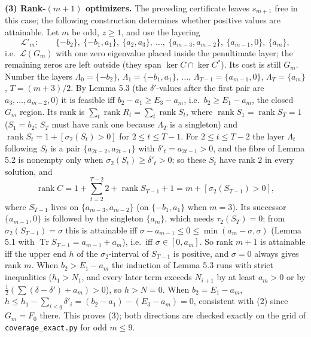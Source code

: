 \documentclass[
  11pt,
  a4paper,
]{article}
\newcounter{none} %
\begin{document}
\textbf{(3) Rank-\((m+1)\) optimizers.} The preceding certificate leaves
\(s_{m+1}\) free in this case; the following construction determines
whether positive values are attainable. Let \(m\) be odd, \(z\ge1\), and
use the layering
\[\mathcal L'_m:\qquad \{-b_2\},\ \{-b_1,a_1\},\ \{a_2,a_3\},\ \dots,\ \{a_{m-3},a_{m-2}\},\ \{a_{m-1},0\},\ \{a_m\},\]
i.e.~\(\mathcal L(G_m)\) with one zero eigenvalue placed inside the
penultimate layer; the remaining zeros are left outside (they span
\(\ker C\cap\ker C^*\)). Its cost is still \(G_m\). Number the layers
\(\Lambda_0=\{-b_2\}\), \(\Lambda_1=\{-b_1,\allowbreak{}a_1\}\), \(\dots\),
\(\Lambda_{T-1}=\{a_{m-1},\allowbreak{}0\}\), \(\Lambda_T=\{a_m\}\), \(T=(m+3)/2\).
By Lemma 5.3 (the \(\delta'\)-values after the first pair are
\(a_3,\allowbreak{}\dots,\allowbreak{}a_{m-2},\allowbreak{}0\)) it is feasible iff \(b_2-a_1\ge E_3-a_m\),
i.e.~\(b_2\ge E_1-a_m\), the closed \(G_m\) region. Its rank is
\(\sum_t\operatorname{rank}R_t=\sum_t\operatorname{rank}S_t\), where
\(\operatorname{rank}S_1=\operatorname{rank}S_T=1\) (\(S_1=b_2\);
\(S_T\) must have rank one because \(\Lambda_T\) is a singleton) and
\(\operatorname{rank}S_t=1+[\sigma_2(S_t)>0]\) for \(2\le t\le T-1\).
For \(2\le t\le T-2\) the layer \(\Lambda_t\) following \(S_t\) is a
pair \(\{a_{2t-2},\allowbreak{}a_{2t-1}\}\) with \(\delta'_t=a_{2t-1}>0\), and the
fibre of Lemma 5.2 is nonempty only when
\(\sigma_2(S_t)\ge\delta'_t>0\); so these \(S_t\) have rank \(2\) in
every solution, and
\[\operatorname{rank}C=1+\sum_{t=2}^{T-2}2+\operatorname{rank}S_{T-1}+1=m+[\sigma_2(S_{T-1})>0],\]
where \(S_{T-1}\) lives on \(\{a_{m-3},\allowbreak{}a_{m-2}\}\) (on \(\{-b_1,\allowbreak{}a_1\}\)
when \(m=3\)). Its successor \(\{a_{m-1},\allowbreak{}0\}\) is followed by the
singleton \(\{a_m\}\), which needs \(\tau_2(S_T)=0\); from
\(\sigma_2(S_{T-1})=\sigma\) this is attainable iff
\(\sigma-a_{m-1}\le0\le\min(a_m-\sigma,\allowbreak{}\sigma)\) (Lemma 5.1 with
\(\operatorname{Tr}S_{T-1}=a_{m-1}+a_m\)), i.e.~iff
\(\sigma\in[0,\allowbreak{}a_m]\). So rank \(m+1\) is attainable iff the upper end
\(h\) of the \(\sigma_2\)-interval of \(S_{T-1}\) is positive, and
\(\sigma=0\) always gives rank \(m\). When \(b_2>E_1-a_m\) the induction
of Lemma 5.3 runs with strict inequalities (\(h_1>N_1\), and every later
term exceeds \(N_{i+1}\) by at least \(a_m>0\) or by
\(\tfrac12(\sum(\delta-\delta')+a_m)>0\)), so \(h>N=0\). When
\(b_2=E_1-a_m\), \(h\le h_1-\sum_{i<q}\delta'_i=(b_2-a_1)-(E_3-a_m)=0\),
consistent with (2) since \(G_m=F_0\) there. This proves (3); both
directions are checked exactly on the grid of
{\small\texttt{coverage\_\allowbreak{}exact.\allowbreak{}py}} for odd \(m\le9\).
\end{document}
